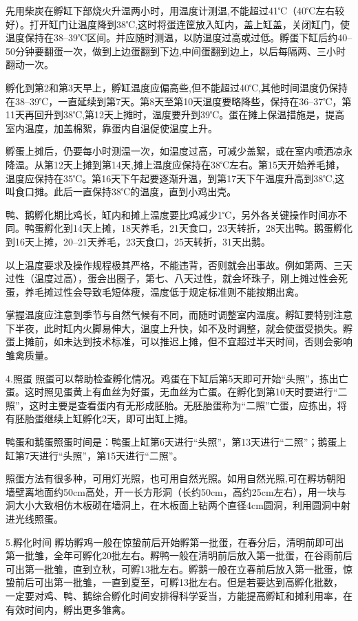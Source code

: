 \documentclass{ctexbook}
\begin{document}
先用柴炭在孵缸下部烧火升温两小时，用温度计测温,不能超过41℃（40℃左右较好）。打开缸门让温度降到38℃,这时将蛋连筐放入缸内，盖上缸盖，关闭缸门，使温度保持在38--39℃区间。并应随时测温，以防温度过高或过低。孵蛋下缸后约40--50分钟要翻蛋一次，做到上边蛋翻到下边,中间蛋翻到边上，以后每隔两、三小时翻动一次。

孵化到第2和第3天早上，孵缸温度应偏高些,但不能超过40℃,其他时间温度仍保持在38--39℃，一直延续到第7天。第8天至第10天温度要略降些，保持在36--37℃，第11天再回升到38℃,第12天上摊时，温度要升到39℃。蛋在摊上保温措施是，提高室内温度，加盖棉絮，靠蛋内自温促使温度上升。

孵蛋上摊后，仍要每小时测温一次，如温度过高，可减少盖絮，或在室内喷洒凉永降温。从第12天上摊到第14天,摊上温度应保持在38℃左右。第15天开始养毛摊，温度应保持在35℃。第16天下午起要逐渐升温，到第17天下午温度升高到38℃,这叫食口摊。此后一直保持38℃的温度，直到小鸡出壳。

鸭、鹅孵化期比鸡长，缸内和摊上温度要比鸡减少1℃，另外各关键操作时间亦不同。鸭蛋孵化到14天上摊，18天养毛，21天食口，23天转折，28天出鸭。鹅蛋孵化到16天上摊，20--21天养毛，23天食口，25天转折，31天出鹅。

以上温度要求及操作规程极其严格，不能违背，否则就会出事故。例如第两、三天过性（温度过高），蛋会出圈子，第七、八天过性，就会坏珠子，刚上摊过性会死蛋，养毛摊过性会导致毛短体瘦，温度低于规定标准则不能按期出禽。

掌握温度应注意到季节与自然气候有不同，而随时调整室内温度。孵缸要特别注意下半夜，此时缸内火脚易伸大，温度上升快，如不及时调整，就会使蛋受损失。孵蛋上摊前，如未达到技术标准，可以推迟上摊，但不宜超过半天时间，否则会影响雏禽质量。

4.照蛋 照蛋可以帮助检查孵化情况。鸡蛋在下缸后第5天即可开始“头照”，拣出亡蛋。这时照见蛋黄上有血丝为好蛋，无血丝为亡蛋。在孵化到第10天时要进行“二照”，这时主要是查看蛋内有无形成胚胎。无胚胎蛋称为“二照”亡蛋，应拣出，将有胚胎蛋继续上缸孵化2天，即可出缸上摊。

鸭蛋和鹅蛋照蛋时间是：鸭蛋上缸第6天进行“头照”，第13天进行“二照”；鹅蛋上缸第7天进行“头照”，第15天进行“二照”。

照蛋方法有很多种，可用灯光照，也可用自然光照。如用自然光照,可在孵坊朝阳墙壁离地面约50cm高处，开一长方形洞（长约50cm，高约25cm左右），用一块与洞大小大致相仿木板砌在墙洞上，在木板面上钻两个直径4cm圆洞，利用圆洞中射进光线照蛋。

5.孵化时间 孵坊孵鸡一般在惊蛰前后开始孵第一批蛋，在春分后，清明前即可出第一批雏，全年可孵化20批左右。孵鸭一般在清明前后放入第一批蛋，在谷雨前后可出第一批雏，直到立秋，可孵13批左右。孵鹅一般在立春前后放入第一批蛋，惊蛰前后可出第一批雏，一直到夏至，可孵13批左右。但是若要达到高孵化批数， 一定要对鸡、鸭、鹅综合孵化时间安排得科学妥当，方能提高孵缸和摊利用率，在有效时间内，孵出更多雏禽。
\end{document}
